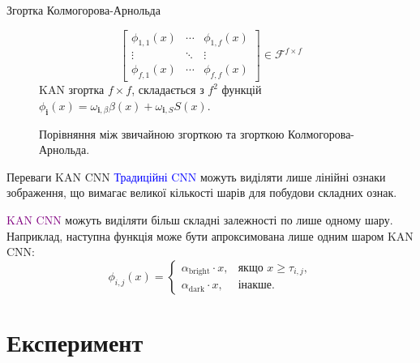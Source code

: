 \documentclass{zkdl-presentation-template}
\begin{document}
\begin{frame}[fragile]{Згортка Колмогорова-Арнольда}
\begin{figure}
\begin{minipage}{0.48\linewidth}
{\begin{equation*}
\begin{bmatrix}
                \phi_{1,1}(x) & \cdots & \phi_{1,f}(x) \\
                \vdots & \ddots & \vdots \\
                \phi_{f,1}(x) & \cdots & \phi_{f,f}(x)
            \end{bmatrix} \in \mathcal{F}^{f \times f}
            \end{equation*}
            KAN згортка $f \times f$, складається з $f^2$ функцій
            $\phi_{\boldsymbol{i}}(x)=\omega_{\boldsymbol{i},\beta}\beta(x)+\omega_{\boldsymbol{i},S} S(x)$.}
            \end{minipage}
            \caption{Порівняння між звичайною згорткою та згорткою Колмогорова-Арнольда.}
            \label{fig:kan_conv}
        \end{figure}
    \end{frame}

    \begin{frame}{Переваги KAN CNN}
        \textcolor{blue}{Традиційні CNN} можуть виділяти лише лінійні 
        ознаки зображення, що вимагає великої кількості шарів для 
        побудови складних ознак. \pause
        
        \textcolor{purple}{KAN CNN} можуть виділяти більш складні 
        залежності по лише одному шару. Наприклад, наступна функція 
        може бути апроксимована лише одним шаром KAN CNN:
        \begin{equation*}
            \phi_{i,j}(x) = \begin{cases}
                \alpha_{\text{bright}}\cdot x, & \text{якщо } x \geq \tau_{i,j}, \\
                \alpha_{\text{dark}}\cdot x, & \text{інакше.}
            \end{cases}
        \end{equation*}
    \end{frame}

    \section{Експеримент}
\end{document}
